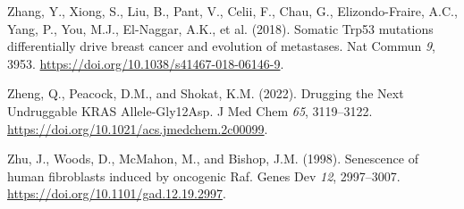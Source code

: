 \begin{CSLReferences}{0}{0}
\leavevmode{}%
Zhang, Y., Xiong, S., Liu, B., Pant, V., Celii, F., Chau, G., Elizondo-Fraire, A.C., Yang, P., You, M.J., El-Naggar, A.K., et al. (2018). Somatic Trp53 mutations differentially drive breast cancer and evolution of metastases. Nat Commun \emph{9}, 3953. \url{https://doi.org/10.1038/s41467-018-06146-9}.

\leavevmode{}%
Zheng, Q., Peacock, D.M., and Shokat, K.M. (2022). Drugging the Next Undruggable KRAS Allele-Gly12Asp. J Med Chem \emph{65}, 3119--3122. \url{https://doi.org/10.1021/acs.jmedchem.2c00099}.

\leavevmode{}%
Zhu, J., Woods, D., McMahon, M., and Bishop, J.M. (1998). Senescence of human fibroblasts induced by oncogenic Raf. Genes Dev \emph{12}, 2997--3007. \url{https://doi.org/10.1101/gad.12.19.2997}.

\end{CSLReferences}
